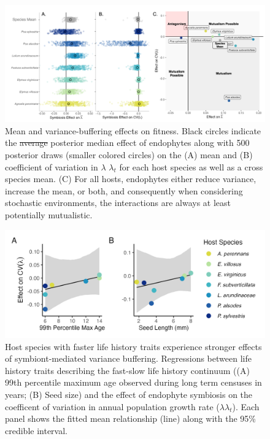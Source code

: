 \documentclass[lineno, sn-basic]{sn-jnl}%
\providecommand{\DIFadd}[1]{{\protect\color{blue}#1}} %
\providecommand{\DIFdel}[1]{{\protect\color{red}\protect\scriptsize\sout{#1}}}
\providecommand{\DIFadd}[1]{{\protect\color{blue}\uwave{#1}}} %
\providecommand{\DIFdel}[1]{{\protect\color{red}\sout{#1}}}                      %
\providecommand{\DIFaddFL}[1]{\DIFadd{#1}} %
\providecommand{\DIFdelFL}[1]{\DIFdel{#1}} %
\providecommand{\DIFaddbeginFL}{} %
\providecommand{\DIFaddendFL}{} %
\providecommand{\DIFdelbeginFL}{} %
\providecommand{\DIFdelendFL}{} %
\newcommand{\DIFscaledelfig}{0.5}
\newlength{\DIFdelgraphicswidth} %
\newlength{\DIFdelgraphicsheight} %
\newcommand{\DIFaddincludegraphics}[2][]{{\color{blue}\fbox{\DIFOincludegraphics[#1]{#2}}}} %
\newcommand{\DIFdelincludegraphics}[2][]{%
\sbox{\DIFdelgraphicsbox}{\DIFOincludegraphics[#1]{#2}}%
\settoboxwidth{\DIFdelgraphicswidth}{\DIFdelgraphicsbox} %
\settoboxtotalheight{\DIFdelgraphicsheight}{\DIFdelgraphicsbox} %
\scalebox{\DIFscaledelfig}{%
\parbox[b]{\DIFdelgraphicswidth}{\usebox{\DIFdelgraphicsbox}\\[-\baselineskip] \rule{\DIFdelgraphicswidth}{0em}}\llap{\resizebox{\DIFdelgraphicswidth}{\DIFdelgraphicsheight}{%
\setlength{\unitlength}{\DIFdelgraphicswidth}%
\begin{picture}(1,1)%
\thicklines\linethickness{2pt} %
{\color[rgb]{1,0,0}\put(0,0){\framebox(1,1){}}}%
{\color[rgb]{1,0,0}\put(0,0){\line( 1,1){1}}}%
{\color[rgb]{1,0,0}\put(0,1){\line(1,-1){1}}}%
\end{picture}%
}\hspace*{3pt}}} %
} %
\DeclareRobustCommand{\DIFaddbeginFL}{\DIFOaddbeginFL \let\includegraphics\DIFaddincludegraphics} %
\DeclareRobustCommand{\DIFaddendFL}{\DIFOaddendFL \let\includegraphics\DIFOincludegraphics} %
\DeclareRobustCommand{\DIFdelbeginFL}{\DIFOdelbeginFL \let\includegraphics\DIFdelincludegraphics} %
\DeclareRobustCommand{\DIFdelendFL}{\DIFOaddendFL \let\includegraphics\DIFOincludegraphics} %
\begin{document}
\begin{figure}
	\centering
	\DIFdelbeginFL %
\DIFdelendFL \DIFaddbeginFL \includegraphics[width =\linewidth]{StochDemo_newFig3.png}
	\caption[Mean and variance-buffering effects on fitness]{\DIFaddendFL Mean and variance-buffering effects on fitness. Black circles indicate the \DIFdelbeginFL \DIFdelFL{average }\DIFdelendFL \DIFaddbeginFL \DIFaddFL{posterior median }\DIFaddendFL effect of endophytes along with 500 posterior draws (smaller colored circles) on the (A) mean and (B) coefficient of variation in \DIFdelbeginFL \DIFdelFL{$\lambda$ }\DIFdelendFL \DIFaddbeginFL \DIFaddFL{$\lambda_{t}$ }\DIFaddendFL for each host species as well as a cross species mean. (C) For all hosts, endophytes either reduce variance, increase the mean, or both, and consequently when considering stochastic environments, the interactions are always at least potentially mutualistic.}
\end{figure}

\begin{figure}
	\centering
	\includegraphics[width=.8\linewidth]{StochDemo_fig4new.png}
	\DIFdelbeginFL %
\DIFdelendFL \DIFaddbeginFL \caption[Host species with faster life history traits experience stronger effects of symbiont-mediated variance buffering]{\DIFaddendFL Host species with faster life history traits experience stronger effects of symbiont-mediated variance buffering. Regressions between life history traits describing the fast-slow life history continuum ((A) 99th percentile maximum age observed during long term censuses in years; (B) Seed size) and the effect of endophyte symbiosis on the coefficent of variation in \DIFaddbeginFL \DIFaddFL{annual }\DIFaddendFL population growth rate (\DIFdelbeginFL \DIFdelFL{$\lambda$}\DIFdelendFL \DIFaddbeginFL \DIFaddFL{$\lambda_{t}$}\DIFaddendFL ). Each panel shows the fitted mean relationship (line) along with the 95\% credible interval.}
\end{figure}
\end{document}
